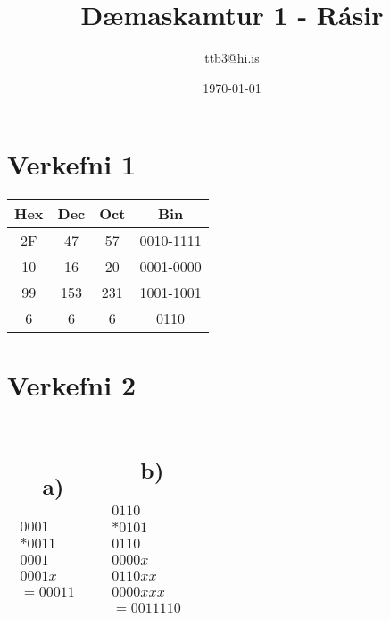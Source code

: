 \documentclass{article}
\title{Dæmaskamtur 1 - Rásir}
\author{ttb3@hi.is}
\date{\today}
\begin{document}
\maketitle

\section*{Verkefni 1}
\begin{center}
    \begin{tabular}{|c|c|c|c|}
        \hline
        Hex & Dec & Oct & Bin \\
        \hline
        2F & 47 & 57 & 0010-1111 \\
        \hline
        10 & 16 & 20 & 0001-0000 \\
        \hline
        99 & 153 & 231 &  1001-1001 \\
        \hline
        6 & 6 & 6 & 0110 \\
        \hline
    \end{tabular}
\end{center}

\section*{Verkefni 2}
\begin{center}
    \begin{tabular}{|c|c|}
        \hline
        \parbox{6cm}{
        \subsection*{a)}    
        \begin{align*}
            0001 & \\
            *  0011 & \\
            \hline
            0001 & \\
            0001x & \\
            =  00011 &
        \end{align*}} &
        \parbox{6cm}{
        \subsection*{b)}    
        \begin{align*}
            0110 & \\
            * 0101 & \\
            \hline
            0110 & \\
            0000x & \\
            0110xx & \\
            0000xxx & \\
            =  0011110
          \end{align*}}\\ 
          \hline
    \end{tabular}
\end{center}
\end{document}
